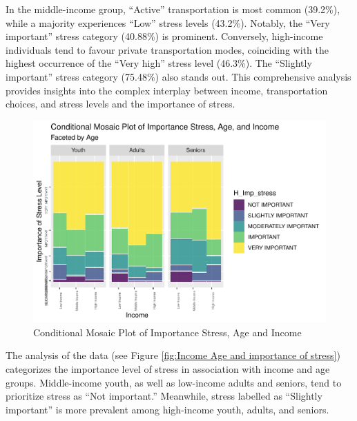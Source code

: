 \documentclass[
11pt, %
oneside, %
english, %
singlespacing, %
]{macthesis} %
\begin{document}
In the middle-income group, ``Active'' transportation is most common (39.2\%), while a majority experiences ``Low'' stress levels (43.2\%). Notably, the ``Very important'' stress category (40.88\%) is prominent. Conversely, high-income individuals tend to favour private transportation modes, coinciding with the highest occurrence of the ``Very high'' stress level (46.3\%). The ``Slightly important'' stress category (75.48\%) also stands out. This comprehensive analysis provides insights into the complex interplay between income, transportation choices, and stress levels and the importance of stress.
\begin{figure}
\includegraphics[width=0.85\linewidth]{thesis_files/figure-latex/unnamed-chunk-34-1} \caption{\label{fig:Income Age and importance of stress}Conditional Mosaic Plot of Importance Stress, Age and Income}\label{fig:unnamed-chunk-34}
\end{figure}
The analysis of the data (see Figure \ref{fig:Income Age and importance of stress}) categorizes the importance level of stress in association with income and age groups. Middle-income youth, as well as low-income adults and seniors, tend to prioritize stress as ``Not important.'' Meanwhile, stress labelled as ``Slightly important'' is more prevalent among high-income youth, adults, and seniors.
\end{document}
